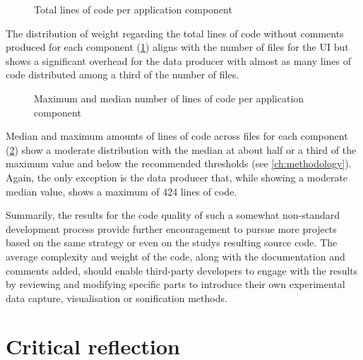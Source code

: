 \begin{figure}[h]
\centering

\caption[Lines of code (total)]{Total lines of code per application component\protect}
\label{fig:linesOfCodeTotal}
\end{figure}

The distribution of weight regarding the total lines of code without comments produced for each component (\ref{fig:linesOfCodeTotal}) aligns with the number of files for the \ac{UI} but shows a significant overhead for the data producer with almost as many lines of code distributed among a third of the number of files.

\begin{figure}[h]
\centering

\caption[Lines of code]{Maximum and median number of lines of code per application component\protect}
\label{fig:linesOfCode}
\end{figure}

Median and maximum amounts of lines of code across files for each component (\ref{fig:linesOfCode}) show a moderate distribution with the median at about half or a third of the maximum value and below the recommended thresholds (see \autoref{ch:methodology}).
Again, the only exception is the data producer that, while showing a moderate median value, shows a maximum of 424 lines of code.

Summarily, the results for the code quality of such a somewhat non-standard development process provide further encouragement to pursue more projects based on the same strategy or even on the study\textquotesingle s resulting source code.
The average complexity and weight of the code, along with the documentation and comments added, should enable third-party developers to engage with the results by reviewing and modifying specific parts to introduce their own experimental data capture, visualisation or sonification methods.

\section{Critical reflection}
\label{sec:critical-reflection}

